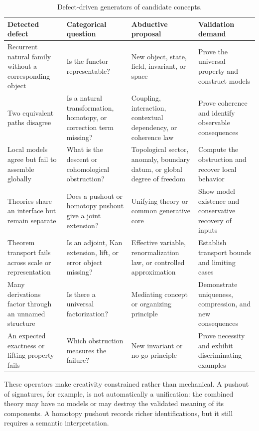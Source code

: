 \documentclass[11pt]{article}
\begin{document}
\begin{table}[ht]
\centering
\small
\begin{tabularx}{\textwidth}{>{\raggedright\arraybackslash}p{}
>{\raggedright\arraybackslash}p{}
>{\raggedright\arraybackslash}p{}
X}
\toprule
Detected defect & Categorical question & Abductive proposal & Validation demand \\
\midrule
Recurrent natural family without a corresponding object & Is the functor representable? & New object, state, field, invariant, or space & Prove the universal property and construct models \\
Two equivalent paths disagree & Is a natural transformation, homotopy, or correction term missing? & Coupling, interaction, contextual dependency, or coherence law & Prove coherence and identify observable consequences \\
Local models agree but fail to assemble globally & What is the descent or cohomological obstruction? & Topological sector, anomaly, boundary datum, or global degree of freedom & Compute the obstruction and recover local behavior \\
Theories share an interface but remain separate & Does a pushout or homotopy pushout give a joint extension? & Unifying theory or common generative core & Show model existence and conservative recovery of inputs \\
Theorem transport fails across scale or representation & Is an adjoint, Kan extension, lift, or error object missing? & Effective variable, renormalization law, or controlled approximation & Establish transport bounds and limiting cases \\
Many derivations factor through an unnamed structure & Is there a universal factorization? & Mediating concept or organizing principle & Demonstrate uniqueness, compression, and new consequences \\
An expected exactness or lifting property fails & Which obstruction measures the failure? & New invariant or no-go principle & Prove necessity and exhibit discriminating examples \\
\bottomrule
\end{tabularx}
\caption{Defect-driven generators of candidate concepts.}
\label{tab:defects}
\end{table}

These operators make creativity constrained rather than mechanical. A pushout of signatures, for
example, is not automatically a unification: the combined theory may have no models or may destroy
the validated meaning of its components. A homotopy pushout records richer identifications, but it
still requires a semantic interpretation.
\end{document}

